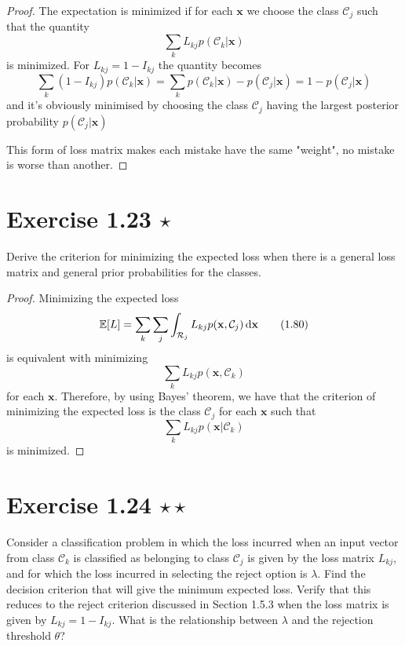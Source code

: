 \vspace{1em}

\begin{proof}
    The expectation is minimized if for each $\mathbf{x}$ we choose the class $\mathcal{C}_j$ such
    that the quantity
    \begin{equation*}
        \sum_k L_{kj} p(\mathcal{C}_k | \mathbf{x})
        \tag{1.81}\label{eq:1.81}
    \end{equation*}
    is minimized. For $L_{kj} = 1 - I_{kj}$ the quantity becomes
    \[
        \sum_k (1 - I_{kj})p(\mathcal{C}_k | \mathbf{x}) 
        = \sum_k p(\mathcal{C}_k | \mathbf{x}) - p(\mathcal{C}_j | \mathbf{x}) 
        = 1 - p(\mathcal{C}_j | \mathbf{x})
    \] 
    and it's obviously minimised by choosing the class $\mathcal{C}_j$ having the largest 
    posterior probability $p(\mathcal{C}_j | \mathbf{x})$

    This form of loss matrix makes each mistake have the same "weight", no mistake
    is worse than another.
\end{proof}

\section*{Exercise 1.23 $\star$}
Derive the criterion for minimizing the expected loss when there
is a general loss matrix and general prior probabilities for the classes.

\vspace{1em}

\begin{proof}
    Minimizing the expected loss
    \begin{equation*}
        \mathbb{E}[L] = \sum_k \sum_j \int_{\mathcal{R}_j} L_{kj} p(\mathbf{x}, \mathcal{C}_j) \mathop{}\!\mathrm{d} \mathbf{x}
        \tag{1.80}\label{eq:1.80}
    \end{equation*}
    is equivalent with minimizing 
    \[
        \sum_k L_{kj} p(\mathbf{x}, \mathcal{C}_k)
    \] 
    for each $\mathbf{x}$. Therefore, by using Bayes' theorem, we have that
    the criterion of minimizing the expected loss is the class $\mathcal{C}_j$ for each
    $\mathbf{x}$ such that
    \[
        \sum_k L_{kj} p(\mathbf{x} | \mathcal{C}_k)
    \] 
    is minimized.
\end{proof}

\section*{Exercise 1.24 $\star \star$}
Consider a classification problem in which the loss incurred
when an input vector from class $\mathcal{C}_k$ is classified
as belonging to class $\mathcal{C}_j$ is given by the
loss matrix $L_{kj}$, and for which the loss incurred in
selecting the reject option is $\lambda$. Find the decision
criterion that will give the minimum expected loss. Verify
that this reduces to the reject criterion discussed in Section
1.5.3 when the loss matrix is given by $L_{kj} = 1 - I_{kj}$.
What is the relationship between $\lambda$ and the rejection
threshold $\theta$?

